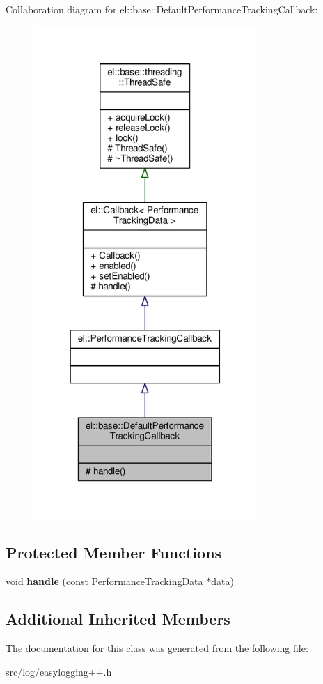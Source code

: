 Collaboration diagram for el\+:\+:base\+:\+:Default\+Performance\+Tracking\+Callback\+:
\nopagebreak
\begin{figure}[H]
\begin{center}
\leavevmode
\includegraphics[width=241pt]{db/ddb/classel_1_1base_1_1DefaultPerformanceTrackingCallback__coll__graph}
\end{center}
\end{figure}
\subsection*{Protected Member Functions}
\begin{DoxyCompactItemize}
\item 
void {\bfseries handle} (const \hyperlink{classel_1_1PerformanceTrackingData}{Performance\+Tracking\+Data} $\ast$data)\hypertarget{classel_1_1base_1_1DefaultPerformanceTrackingCallback_afabb8820e1bd9a7fb89508fe11f59d37}{}\label{classel_1_1base_1_1DefaultPerformanceTrackingCallback_afabb8820e1bd9a7fb89508fe11f59d37}

\end{DoxyCompactItemize}
\subsection*{Additional Inherited Members}


The documentation for this class was generated from the following file\+:\begin{DoxyCompactItemize}
\item 
src/log/easylogging++.\+h\end{DoxyCompactItemize}
